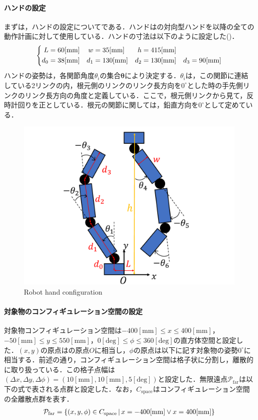 \documentclass[a4paper,twoside,12pt,papersize, dvipdfmx]{iirthesis}
\begin{document}
\paragraph{ハンドの設定}
まずは，ハンドの設定についてである．ハンドはの対向型ハンドを以降の全ての動作計画に対して使用している．ハンドの寸法は以下のように設定した()．
\begin{gather}
\notag
\left\{
\begin{aligned}
L &= 60 \mathrm{[mm]} & w& = 35 \mathrm{[mm]} & h &= 415 \mathrm{[mm]}\\
d_0 &= 38 \mathrm{[mm]} & d_1 &= 130 \mathrm{[mm]} & d_2 &= 130 \mathrm{[mm]} & d_3 = 90 \mathrm{[mm]}
\end{aligned}
\right .
\end{gather}
ハンドの姿勢は，各関節角度$\theta_i$の集合$\bm {\theta}$により決定する．$\theta_i$は，この関節に連結している2リンクの内，根元側のリンクのリンク長方向を$0^\circ$とした時の手先側リンクのリンク長方向の角度と定義している．ここで，根元側リンクから見て，反時計回りを正としている．根元の関節に関しては，鉛直方向を$0^\circ$として定めている．
\begin{figure}[b]
\centering
\includegraphics[width=0.7\hsize]{fig/3-new-planner/handsize.pdf}
\caption{Robot hand configuration}\label{fig::planner::handsize}
\end{figure}

\paragraph{対象物のコンフィギュレーション空間の設定}
対象物コンフィギュレーション空間は$-400 \mathrm{[mm]} \leq x \leq 400 \mathrm{[mm]}$，$-50 \mathrm{[mm]} \leq y \leq 550 \mathrm{[mm]}$，$0 \mathrm{[deg]} \leq \phi \leq 360 \mathrm{[deg]}$の直方体空間と設定した．$(x,y)$の原点はの原点$O$に相当し，$\phi$の原点は以下に記す対象物の姿勢$0^\circ$に相当する．前述の通り，コンフィギュレーション空間は格子状に分割し，離散的に取り扱っている．この格子点幅は$(\Delta x, \Delta y, \Delta \phi) = (10 \mathrm{[mm]}, 10 \mathrm{[mm]}, 5 \mathrm{[deg]})$と設定した．無限遠点$\mathcal{P}_{\mathrm {far}}$は以下の式で表される点群と設定した．なお，$C_{\mathrm {space}}$はコンフィギュレーション空間の全離散点群を表す．
\begin{gather}
\notag
\mathcal{P}_{\mathrm {far}} = \{ (x, y, \phi) \in C_{\mathrm {space}} \,|\, x = -400 \mathrm{[mm]} \lor x = 400 \mathrm{[mm]} \}
\end{gather}
\end{document}
